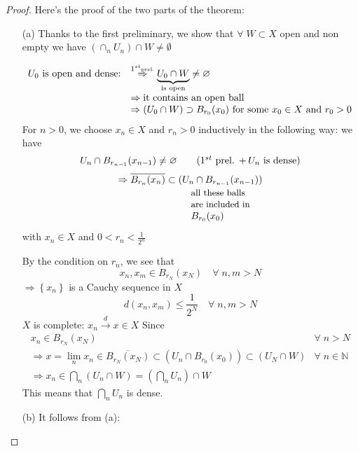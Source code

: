 \begin{proof} Here's the proof of the two parts of the theorem:
    \begin{itemize}
        \item[(a)] Thanks to the first preliminary, we show that \(\forall \; W \subset X\) open and non empty we have \((\cap_n U_n) \cap W \neq \emptyset\)
        
        \[
            \begin{array}{rl}
                U_0 \text{ is open and dense:} & \overset{1^{st}\text{\tiny{prel.}}}{\Rightarrow} \underbrace{U_0 \cap W}_{\text{is open}} \neq \emptyset \\
                & \Rightarrow \text{it contains an open ball} \\
                & \Rightarrow (U_0 \cap W) \supset B_{r_0}(x_0) \mbox{ for some } x_0 \in X \mbox{ and } r_0 > 0
        \end{array}
        \] 
        For \(n>0\), we choose \(x_n \in X\) and \(r_n > 0\) inductively in the following way: we have 
        \[
            U_n \cap B_{r_{n-1}}(x_{n-1}) \neq \emptyset 
        \tag*{(\(1^{st}\) prel. \(+ \, U_n\) is dense)}\]
        \[
            \Rightarrow \overline{B_{r_n}(x_n)} \subset \underset{\begin{array}{l}\text{\small{all these balls}} \\ \text{\small{are included in}} \\
            \displaystyle{B_{r_0}(x_0)}\end{array}}{(U_n \cap B_{r_{n-1}}(x_{n-1}))}
        \]
        with \(x_n \in X\) and \(0 < r_n < \frac{1}{2^n}\)

        By the condition on \(r_n\), we see that 
        \[
            x_n, x_m \in B_{r_N}(x_N) \quad \forall \; n,m > N
        \]
        \(\Rightarrow \left\{ x_n \right\}\) is a Cauchy sequence in \(X\)
        \[
            d(x_n, x_m) \leq \frac{1}{2^N} \quad \forall \; n,m > N
        \]
        \(X\) is complete: \(x_n \overset{d}{\rightarrow} x \in X\)
        Since 
        \[
            \begin{array}{lr}
                x_n \in B_{r_N}(x_N) & \forall \; n > N \\
                \Rightarrow x = \lim_n x_n \in \overline{B_{r_N}(x_N)} \subset (U_n \cap B_{r_0}(x_0)) \subset (U_N \cap W) & \forall \; n \in \mathbb{N} \\
                \Rightarrow x_n \in \bigcap_n (U_n \cap W) = \left(\bigcap_n U_n\right) \cap W
            \end{array}
        \]
        This means that \(\bigcap_n U_n\) is dense.
        \item[(b)] It follows from (a):
        

\end{itemize}
\end{proof}
